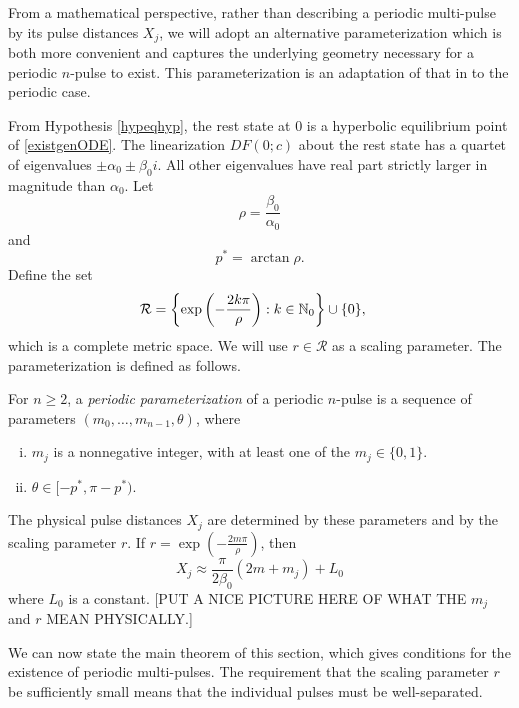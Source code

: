 \documentclass[thesis.tex]{subfiles}
\begin{document}
From a mathematical perspective, rather than describing a periodic multi-pulse by its pulse distances $X_j$, we will adopt an alternative parameterization which is both more convenient and captures the underlying geometry necessary for a periodic $n$-pulse to exist. This parameterization is an adaptation of that in \cite{SandstedeStrut,Sandstede1998} to the periodic case. 

From Hypothesis \ref{hypeqhyp}, the rest state at 0 is a hyperbolic equilibrium point of \cref{existgenODE}. The linearization $DF(0; c)$ about the rest state has a quartet of eigenvalues $\pm \alpha_0 \pm \beta_0 i$. All other eigenvalues have real part strictly larger in magnitude than $\alpha_0$. Let
\begin{equation}\label{defrho}
\rho = \frac{\beta_0}{\alpha_0}
\end{equation}
and
\begin{equation}\label{pstar}
p^* = \arctan \rho.
\end{equation}
Define the set
\begin{align}
\mathcal{R} &= \left\{ \mathop\mathrm{exp}\nolimits\left(-\frac{2 k \pi}{\rho}\right) : k \in \mathbb{N}_0 \right\} \cup \{ 0 \},
\end{align}
which is a complete metric space. We will use $r \in \mathcal{R}$ as a scaling parameter. The parameterization is defined as follows.

\begin{definition}\label{def:perparam}
For $n \geq 2$, a \emph{periodic parameterization} of a periodic $n$-pulse is a sequence of parameters $(m_0, \dots, m_{n-1}, \theta)$, where
\begin{enumerate}[(i)]
\item $m_j$ is a nonnegative integer, with at least one of the $m_j \in \{0, 1\}$.
\item $\theta \in [-p^*, \pi - p^*)$.
\end{enumerate}
\end{definition}

The physical pulse distances $X_j$ are determined by these parameters and by the scaling parameter $r$. If $r = \exp\left(-\frac{2 m \pi}{\rho}\right)$, then
\[
X_j \approx \frac{\pi}{2 \beta_0}(2 m + m_j) + L_0
\]
where $L_0$ is a constant. [PUT A NICE PICTURE HERE OF WHAT THE $m_j$ and $r$ MEAN PHYSICALLY.] 

We can now state the main theorem of this section, which gives conditions for the existence of periodic multi-pulses. The requirement that the scaling parameter $r$ be sufficiently small means that the individual pulses must be well-separated. 
\end{document}

